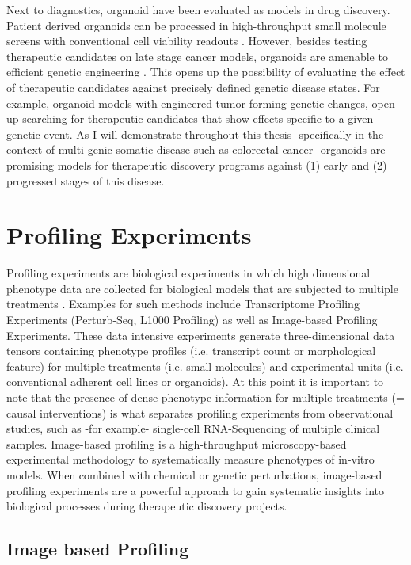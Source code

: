 \begin{flushleft}
Next to diagnostics, organoid have been evaluated as models in drug discovery. Patient derived organoids can be processed in high-throughput small molecule screens with conventional cell viability readouts \cite{VanDeWetering2015}. However, besides testing therapeutic candidates on late stage cancer models, organoids are amenable to efficient genetic engineering \cite{Matano2015-zw, Drost2017-fu}. This opens up the possibility of evaluating the effect of therapeutic candidates against precisely defined genetic disease states. For example, organoid models with engineered tumor forming genetic changes, open up searching for therapeutic candidates that show effects specific to a given genetic event. As I will demonstrate throughout this thesis -specifically in the context of multi-genic somatic disease such as colorectal cancer- organoids are promising models for therapeutic discovery programs against (1) early and (2) progressed stages of this disease.

\section{Profiling Experiments} 

Profiling experiments are biological experiments in which high dimensional phenotype data are collected for biological models that are subjected to multiple treatments \cite{chandrasekaranImagebasedProfilingDrug2021}. Examples for such methods include Transcriptome Profiling Experiments (Perturb-Seq, L1000 Profiling) as well as Image-based Profiling Experiments. These data intensive experiments generate three-dimensional data tensors containing phenotype profiles (i.e. transcript count or morphological feature) for multiple treatments (i.e. small molecules) and experimental units (i.e. conventional adherent cell lines or organoids). At this point it is important to note that the presence of dense phenotype information for multiple treatments (= causal interventions) is what separates profiling experiments from observational studies, such as -for example- single-cell RNA-Sequencing of multiple clinical samples. Image-based profiling is a high-throughput microscopy-based experimental methodology to systematically measure phenotypes of in-vitro models. When combined with chemical or genetic perturbations, image-based profiling experiments are a powerful approach to gain systematic insights into biological processes during therapeutic discovery projects. 

\subsection{Image based Profiling}


\end{flushleft}

